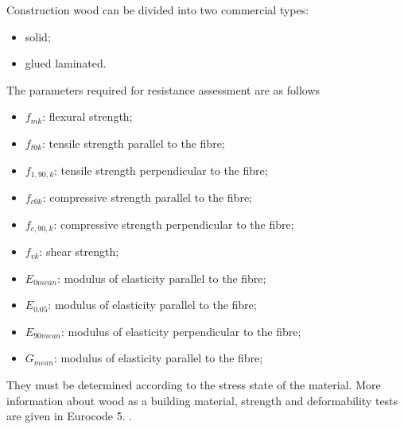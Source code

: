 %

Construction wood can be divided into two commercial types:
\begin{itemize}
    \item solid;
    \item glued laminated.
\end{itemize}
The parameters required for resistance assessment are as follows
\begin{itemize}
    \item $f_{mk}$: flexural strength;
    \item $f_{t0k}$: tensile strength parallel to the fibre;
    \item $f_{1,90,k}$: tensile strength perpendicular to the fibre;
    \item $f_{c0k}$: compressive strength parallel to the fibre;
    \item $f_{c,90,k}$: compressive strength perpendicular to the fibre;
    \item $f_{vk}$: shear strength;
    \item $E_{0mean}$: modulus of elasticity parallel to the fibre;
    \item $E_{0.05}$: modulus of elasticity parallel to the fibre;
    \item $E_{90mean}$: modulus of elasticity perpendicular to the fibre;
    \item $G_{mean}$: modulus of elasticity parallel to the fibre;
\end{itemize}
They must be determined according to the stress state of the material.
More information about wood as a building material, strength and deformability tests are given in Eurocode 5. \cite{wsxbiblio_en1995}.

\FloatBarrier
\needspace{.3\textheight}
